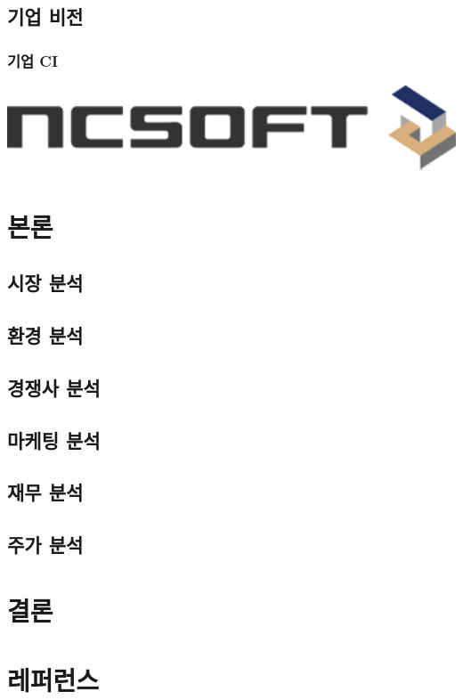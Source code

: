 \documentclass[11pt]{oblivoir}
\begin{document}
		\subsection{기업 비전}
		
		\subsubsection{기업 CI}
			\includegraphics[width=1\textwidth]{ci.png}
	\section{본론}
		\subsection{시장 분석}
		
		\subsection{환경 분석}
		
		\subsection{경쟁사 분석}
		
		\subsection{마케팅 분석}
		
		\subsection{재무 분석}
		
		\subsection{주가 분석}
	
	\section{결론}
	
	\section{레퍼런스}
	
\end{document}
